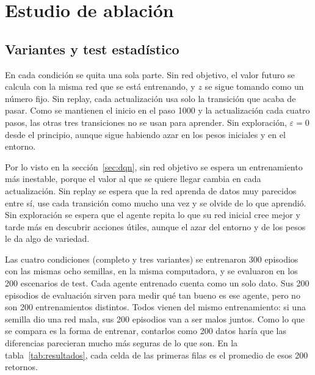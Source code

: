 \documentclass[conference]{IEEEtran}
\begin{document}
\section{Estudio de ablación}
\label{sec:ablacion}
\subsection{Variantes y test estadístico}
En cada condición se quita una sola parte. Sin red objetivo, el valor futuro se calcula con la misma red que se está entrenando, y $z$ se sigue tomando como un número fijo. Sin replay, cada actualización usa solo la transición que acaba de pasar. Como se mantienen el inicio en el paso 1000 y la actualización cada cuatro pasos, las otras tres transiciones no se usan para aprender. Sin exploración, $\varepsilon=0$ desde el principio, aunque sigue habiendo azar en los pesos iniciales y en el entorno.

Por lo visto en la sección~\ref{sec:dqn}, sin red objetivo se espera un entrenamiento más inestable, porque el valor al que se quiere llegar cambia en cada actualización. Sin replay se espera que la red aprenda de datos muy parecidos entre sí, use cada transición como mucho una vez y se olvide de lo que aprendió. Sin exploración se espera que el agente repita lo que su red inicial cree mejor y tarde más en descubrir acciones útiles, aunque el azar del entorno y de los pesos le da algo de variedad.

Las cuatro condiciones (completo y tres variantes) se entrenaron 300 episodios con las mismas ocho semillas, en la misma computadora, y se evaluaron en los 200 escenarios de test. Cada agente entrenado cuenta como un solo dato. Sus 200 episodios de evaluación sirven para medir qué tan bueno es ese agente, pero no son 200 entrenamientos distintos. Todos vienen del mismo entrenamiento: si una semilla dio una red mala, sus 200 episodios van a ser malos juntos. Como lo que se compara es la forma de entrenar, contarlos como 200 datos haría que las diferencias parecieran mucho más seguras de lo que son. En la tabla~\ref{tab:resultados}, cada celda de las primeras filas es el promedio de esos 200 retornos.
\end{document}
